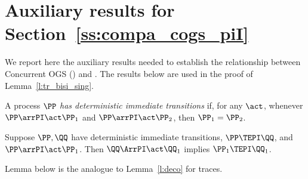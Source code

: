\section{Auxiliary results for Section~\ref{ss:compa_cogs_piI}}
\label{a:aux_tr_bisi_sing}

We report here the auxiliary results needed to establish the 
relationship between Concurrent OGS (\COGS) and \piI. 
%
%
%
%
%
%
%
%
%
%
%
%
%
%
%
The results below are used in the proof of Lemma~\ref{l:tr_bisi_sing}. 



A process $\PP$  \emph{has deterministic immediate transitions} if, for any $\act$, 
whenever $\PP \arrPI\act \PP_1 $ and   $\PP \arrPI\act \PP_2$, then $\PP_1 = \PP_2$. 

\begin{lemma}
\label{l:immediate_tr}
Suppose $\PP,\QQ$ have  deterministic immediate transitions, $\PP \TEPI \QQ$, 
 and $\PP \arrPI\act \PP_1$. Then 
$\QQ \ArrPI \act \QQ_1$ implies $\PP _1 \TEPI \QQ_1$. 
\end{lemma} 
\noindent
Lemma below is the analogue to  Lemma~\ref{l:deco} for traces.

